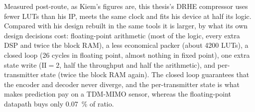 Measured post-route, as Kiem's figures are, this thesis's DRHE compressor uses
fewer LUTs than his IP, meets the same clock and fits his device at half its
logic. Compared with his design rebuilt in the same tools it is larger, by what
its own design decisions cost: floating-point arithmetic (most of the logic,
every extra DSP and twice the block RAM), a less economical packer (about
\num{4200} LUTs), a closed loop (26 cycles in floating point, almost nothing in
fixed point), one extra state write ($\mathrm{II} = 2$, half the throughput and
half the arithmetic), and per-transmitter state (twice the block RAM again).
The closed loop guarantees that the encoder and decoder never diverge, and the
per-transmitter state is what makes prediction pay on a TDM-MIMO sensor,
whereas the floating-point datapath buys only \SI{0.07}{\percent} of ratio.
